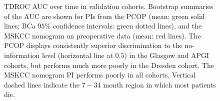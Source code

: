 \documentclass[dissertation.tex]{subfiles}
\begin{document}
\begin{figure}[!htbp]
\centering
\caption[\texorpdfstring{\acrshort{TDROC}}{TD-ROC} \texorpdfstring{\acrshort{AUC}}{AUC} paths for \texorpdfstring{\acrshort{PCOP}}{PCOP} in validation data]{\gls{TDROC} \gls{AUC} over time in validation cohorts.  Bootstrap summaries of the \gls{AUC} are shown for \glspl{PI} from the \gls{PCOP} (mean: green solid lines; BCa $95\%$ confidence intervals: green dotted lines), and the \gls{MSKCC} nomogram on preoperative data (mean: red lines).  The \gls{PCOP} displays consistently superior discrimination to the no-information level (horizontal line at $0.5$) in the Glasgow and \gls{APGI} cohorts, but performs much more poorly in the Dresden cohort.  The \gls{MSKCC} nomogram \gls{PI} performs poorly in all cohorts.  Vertical dashed lines indicate the $7-34$ month region in which most patients die.}
\label{fig:nomo-val-tdroc}
\end{figure}
\end{document}
